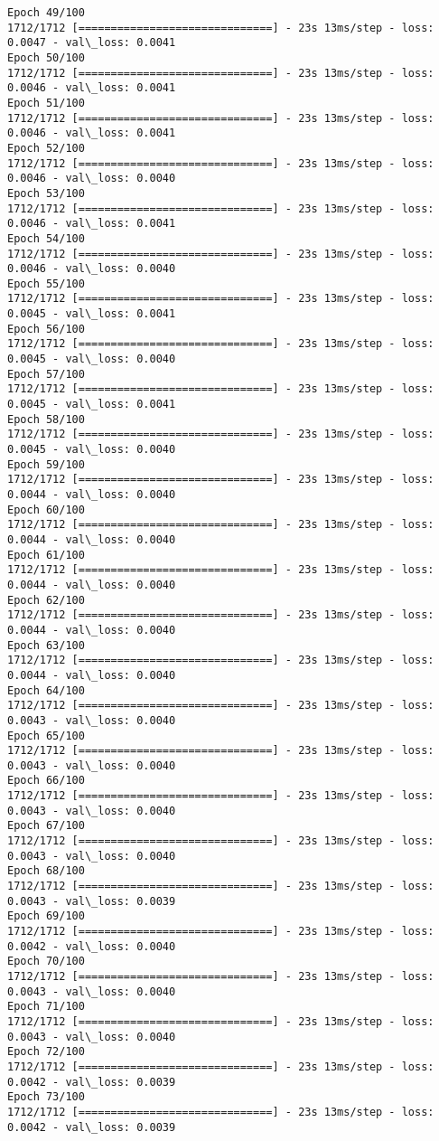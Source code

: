 \documentclass[11pt]{article}
\begin{document}
\begin{Verbatim}[commandchars=\\\{\}]
Epoch 49/100
1712/1712 [==============================] - 23s 13ms/step - loss: 0.0047 - val\_loss: 0.0041
Epoch 50/100
1712/1712 [==============================] - 23s 13ms/step - loss: 0.0046 - val\_loss: 0.0041
Epoch 51/100
1712/1712 [==============================] - 23s 13ms/step - loss: 0.0046 - val\_loss: 0.0041
Epoch 52/100
1712/1712 [==============================] - 23s 13ms/step - loss: 0.0046 - val\_loss: 0.0040
Epoch 53/100
1712/1712 [==============================] - 23s 13ms/step - loss: 0.0046 - val\_loss: 0.0041
Epoch 54/100
1712/1712 [==============================] - 23s 13ms/step - loss: 0.0046 - val\_loss: 0.0040
Epoch 55/100
1712/1712 [==============================] - 23s 13ms/step - loss: 0.0045 - val\_loss: 0.0041
Epoch 56/100
1712/1712 [==============================] - 23s 13ms/step - loss: 0.0045 - val\_loss: 0.0040
Epoch 57/100
1712/1712 [==============================] - 23s 13ms/step - loss: 0.0045 - val\_loss: 0.0041
Epoch 58/100
1712/1712 [==============================] - 23s 13ms/step - loss: 0.0045 - val\_loss: 0.0040
Epoch 59/100
1712/1712 [==============================] - 23s 13ms/step - loss: 0.0044 - val\_loss: 0.0040
Epoch 60/100
1712/1712 [==============================] - 23s 13ms/step - loss: 0.0044 - val\_loss: 0.0040
Epoch 61/100
1712/1712 [==============================] - 23s 13ms/step - loss: 0.0044 - val\_loss: 0.0040
Epoch 62/100
1712/1712 [==============================] - 23s 13ms/step - loss: 0.0044 - val\_loss: 0.0040
Epoch 63/100
1712/1712 [==============================] - 23s 13ms/step - loss: 0.0044 - val\_loss: 0.0040
Epoch 64/100
1712/1712 [==============================] - 23s 13ms/step - loss: 0.0043 - val\_loss: 0.0040
Epoch 65/100
1712/1712 [==============================] - 23s 13ms/step - loss: 0.0043 - val\_loss: 0.0040
Epoch 66/100
1712/1712 [==============================] - 23s 13ms/step - loss: 0.0043 - val\_loss: 0.0040
Epoch 67/100
1712/1712 [==============================] - 23s 13ms/step - loss: 0.0043 - val\_loss: 0.0040
Epoch 68/100
1712/1712 [==============================] - 23s 13ms/step - loss: 0.0043 - val\_loss: 0.0039
Epoch 69/100
1712/1712 [==============================] - 23s 13ms/step - loss: 0.0042 - val\_loss: 0.0040
Epoch 70/100
1712/1712 [==============================] - 23s 13ms/step - loss: 0.0043 - val\_loss: 0.0040
Epoch 71/100
1712/1712 [==============================] - 23s 13ms/step - loss: 0.0043 - val\_loss: 0.0040
Epoch 72/100
1712/1712 [==============================] - 23s 13ms/step - loss: 0.0042 - val\_loss: 0.0039
Epoch 73/100
1712/1712 [==============================] - 23s 13ms/step - loss: 0.0042 - val\_loss: 0.0039

\end{Verbatim}
\end{document}
